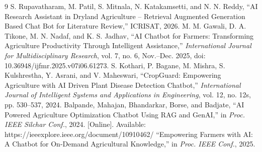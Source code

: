 \documentclass[10pt,twocolumn,letterpaper]{article}
\begin{document}
\begin{thebibliography}{9}
\footnotesize
{} S. Rupavatharam, M. Patil, S. Mitnala, N. Katakamsetti, and N. N. Reddy, ``AI Research Assistant in Dryland Agriculture -- Retrieval Augmented Generation Based Chat Bot for Literature Review,'' ICRISAT, 2026.
 M. M. Gawali, D. A. Tikone, M. N. Nadaf, and K. S. Jadhav, ``AI Chatbot for Farmers: Transforming Agriculture Productivity Through Intelligent Assistance,'' \textit{International Journal for Multidisciplinary Research}, vol. 7, no. 6, Nov.--Dec. 2025, doi: 10.36948/ijfmr.2025.v07i06.61273.
 S. Kothari, P. Bagane, M. Mishra, S. Kulshrestha, Y. Asrani, and V. Maheswari, ``CropGuard: Empowering Agriculture with AI Driven Plant Disease Detection Chatbot,'' \textit{International Journal of Intelligent Systems and Applications in Engineering}, vol. 12, no. 12s, pp. 530--537, 2024.
 Balpande, Mahajan, Bhandarkar, Borse, and Badjate, ``AI Powered Agriculture Optimization Chatbot Using RAG and GenAI,'' in \textit{Proc. IEEE Silchar Conf.}, 2024. [Online]. Available: https://ieeexplore.ieee.org/document/10910462/
 ``Empowering Farmers with AI: A Chatbot for On-Demand Agricultural Knowledge,'' in \textit{Proc. IEEE Conf.}, 2025.
\end{thebibliography}
\end{document}
